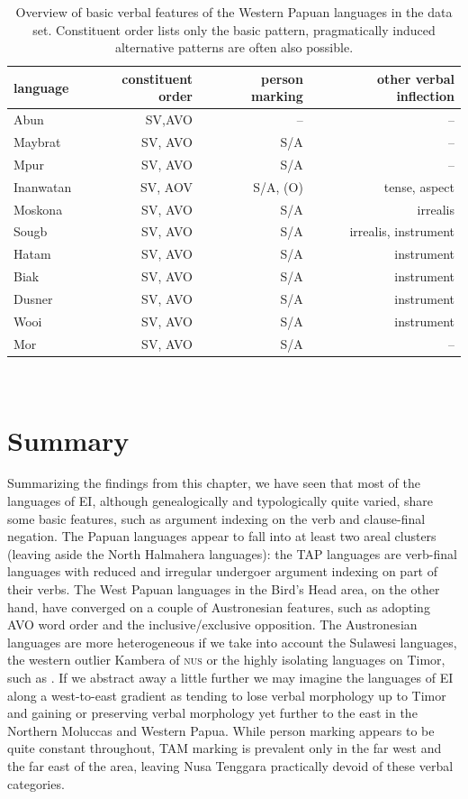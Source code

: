 \begin{table}[h]
\begin{center}
\begin{footnotesize}
\begin{tabular}{l r r r}
\hline\hline
language & constituent order & person marking & other verbal inflection \tabularnewline
\hline
Abun & SV,AVO & -- & -- \tabularnewline
Maybrat & SV, AVO & S/A & -- \tabularnewline
Mpur & SV, AVO & S/A & -- \tabularnewline
Inanwatan & SV, AOV & S/A, (O) & tense, aspect \tabularnewline
\hline
Moskona & SV, AVO & S/A & irrealis \tabularnewline
Sougb & SV, AVO & S/A & irrealis, instrument \tabularnewline
Hatam & SV, AVO & S/A & instrument \tabularnewline
\hline
Biak & SV, AVO & S/A & instrument \tabularnewline
Dusner & SV, AVO & S/A & instrument \tabularnewline
Wooi & SV, AVO & S/A & instrument \tabularnewline
Mor & SV, AVO & S/A & -- \tabularnewline
\hline
\end{tabular}
\caption[Basic verbal features of the Western Papuan languages]{Overview of basic verbal features of the Western Papuan languages in the data set. Constituent order lists only the basic pattern, pragmatically induced alternative patterns are often also possible.}
\label{table:overviewpapua}
\end{footnotesize}
\end{center}
\end{table}
\

\section{Summary}

Summarizing the findings from this chapter, we have seen that most of the languages of EI, although genealogically and typologically quite varied, share some basic features, such as argument indexing on the verb and clause-final negation. The Papuan languages appear to fall into at least two areal clusters (leaving aside the North Halmahera languages): the TAP languages are verb-final languages with reduced and irregular undergoer argument indexing on part of their verbs. The West Papuan languages in the Bird's Head area, on the other hand, have converged on a couple of Austronesian features, such as adopting AVO word order and the inclusive/exclusive opposition. The Austronesian languages are more heterogeneous if we take into account the Sulawesi languages, the western outlier Kambera of \textsc{nus} or the highly isolating languages on Timor, such as . If we abstract away a little further we may imagine the languages of EI along a west-to-east gradient as tending to lose verbal morphology up to Timor and gaining or preserving verbal morphology yet further to the east in the Northern Moluccas and Western Papua. While person marking appears to be quite constant throughout, TAM marking is prevalent only in the far west and the far east of the area, leaving Nusa Tenggara practically devoid of these verbal categories.


